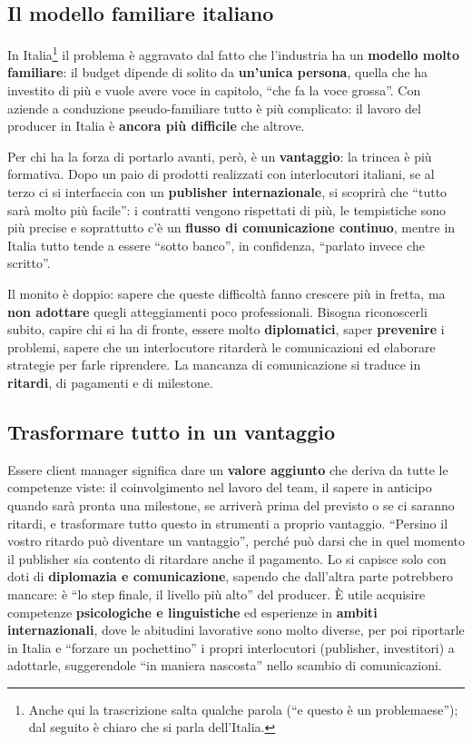 \subsection{Il modello familiare italiano}

In Italia\footnote{Anche qui la trascrizione salta qualche parola (``e questo è
un problemaese''); dal seguito è chiaro che si parla dell'Italia.} il problema è
aggravato dal fatto che l'industria ha un \textbf{modello molto familiare}: il
budget dipende di solito da \textbf{un'unica persona}, quella che ha investito
di più e vuole avere voce in capitolo, ``che fa la voce grossa''. Con aziende a
conduzione pseudo-familiare tutto è più complicato: il lavoro del producer in
Italia è \textbf{ancora più difficile} che altrove.

Per chi ha la forza di portarlo avanti, però, è un \textbf{vantaggio}: la
trincea è più formativa. Dopo un paio di prodotti realizzati con interlocutori
italiani, se al terzo ci si interfaccia con un \textbf{publisher
internazionale}, si scoprirà che ``tutto sarà molto più facile'': i contratti
vengono rispettati di più, le tempistiche sono più precise e soprattutto c'è un
\textbf{flusso di comunicazione continuo}, mentre in Italia tutto tende a essere
``sotto banco'', in confidenza, ``parlato invece che scritto''.

Il monito è doppio: sapere che queste difficoltà fanno crescere più in fretta,
ma \textbf{non adottare} quegli atteggiamenti poco professionali. Bisogna
riconoscerli subito, capire chi si ha di fronte, essere molto
\textbf{diplomatici}, saper \textbf{prevenire} i problemi, sapere che un
interlocutore ritarderà le comunicazioni ed elaborare strategie per farle
riprendere. La mancanza di comunicazione si traduce in \textbf{ritardi}, di
pagamenti e di milestone.

\subsection{Trasformare tutto in un vantaggio}

Essere client manager significa dare un \textbf{valore aggiunto} che deriva da
tutte le competenze viste: il coinvolgimento nel lavoro del team, il sapere in
anticipo quando sarà pronta una milestone, se arriverà prima del previsto o se
ci saranno ritardi, e trasformare tutto questo in strumenti a proprio vantaggio.
``Persino il vostro ritardo può diventare un vantaggio'', perché può darsi che
in quel momento il publisher sia contento di ritardare anche il pagamento. Lo si
capisce solo con doti di \textbf{diplomazia e comunicazione}, sapendo che
dall'altra parte potrebbero mancare: è ``lo step finale, il livello più alto''
del producer. È utile acquisire competenze \textbf{psicologiche e
linguistiche} ed esperienze in \textbf{ambiti internazionali}, dove le abitudini
lavorative sono molto diverse, per poi riportarle in Italia e ``forzare un
pochettino'' i propri interlocutori (publisher, investitori) a adottarle,
suggerendole ``in maniera nascosta'' nello scambio di comunicazioni.

